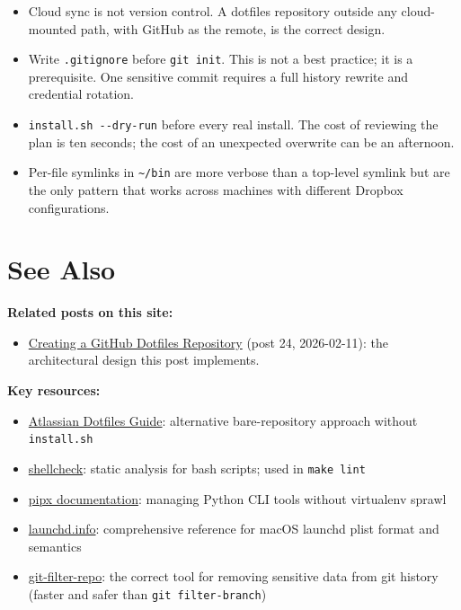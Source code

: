 \documentclass[
  11pt,
  letterpaper,
  DIV=11,
  numbers=noendperiod]{scrartcl}
\providecommand{\tightlist}{%
  \setlength{\itemsep}{0pt}\setlength{\parskip}{0pt}}
\begin{document}
\begin{itemize}
\tightlist
\item
  Cloud sync is not version control. A dotfiles repository outside any
  cloud-mounted path, with GitHub as the remote, is the correct design.
\item
  Write \texttt{.gitignore} before \texttt{git\ init}. This is not a
  best practice; it is a prerequisite. One sensitive commit requires a
  full history rewrite and credential rotation.
\item
  \texttt{install.sh\ -\/-dry-run} before every real install. The cost
  of reviewing the plan is ten seconds; the cost of an unexpected
  overwrite can be an afternoon.
\item
  Per-file symlinks in \texttt{\textasciitilde{}/bin} are more verbose
  than a top-level symlink but are the only pattern that works across
  machines with different Dropbox configurations.
\end{itemize}

\section{See Also}\label{see-also}

\textbf{Related posts on this site:}

\begin{itemize}
\tightlist
\item
  \href{https://focusonr.org/posts/24-setupdotfilesongithub/}{Creating a
  GitHub Dotfiles Repository} (post 24, 2026-02-11): the architectural
  design this post implements.
\end{itemize}

\textbf{Key resources:}

\begin{itemize}
\tightlist
\item
  \href{https://www.atlassian.com/git/tutorials/dotfiles}{Atlassian
  Dotfiles Guide}: alternative bare-repository approach without
  \texttt{install.sh}
\item
  \href{https://www.shellcheck.net/}{shellcheck}: static analysis for
  bash scripts; used in \texttt{make\ lint}
\item
  \href{https://pypa.github.io/pipx/}{pipx documentation}: managing
  Python CLI tools without virtualenv sprawl
\item
  \href{https://www.launchd.info/}{launchd.info}: comprehensive
  reference for macOS launchd plist format and semantics
\item
  \href{https://github.com/newren/git-filter-repo}{git-filter-repo}: the
  correct tool for removing sensitive data from git history (faster and
  safer than \texttt{git\ filter-branch})
\end{itemize}
\end{document}
